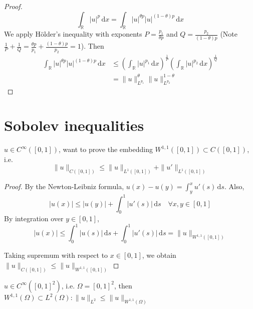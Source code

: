 \documentclass{report}
\begin{document}
\begin{proof}
    \[\int_{\mathbb{R}} \vert u \vert^p \,\mathrm{d}x = \int_{\mathbb{R}} \vert u \vert^{\theta p} \vert u \vert^{(1-\theta) p} \,\mathrm{d}x\]
    We apply Hölder's inequality with exponents \(P = \frac{p_1}{\theta p} \) and \(Q = \frac{p_2}{(1-\theta)p}\) (Note \(\frac{1}{P} + \frac{1}{Q} = \frac{\theta p}{p_1} + \frac{(1-\theta)p}{p_2} = 1\)). Then
    \begin{align*}
        \int_{\mathbb{R}} \vert u \vert^{\theta p} \vert u \vert^{(1-\theta) p} \,\mathrm{d}x &\leq \left(\int_{\mathbb{R}} \vert u \vert^{p_1} \,\mathrm{d}x \right)^{\frac{1}{P}} \left(\int_{\mathbb{R}} \vert u \vert^{p_2} \,\mathrm{d}x \right)^{\frac{1}{Q}} \\
        &= \|u\|_{L^{p_1}}^{\theta} \|u\|_{L^{p_2}}^{1 - \theta}
    \end{align*}
\end{proof}

\section{Sobolev inequalities}
{
    \(u \in C^{\infty}([0,1])\), want to prove the embedding \(W^{1, 1}([0,1]) \subset C([0,1])\), i.e.
    \begin{equation}\label{eq:3}
        \|u\|_{C([0,1])} \leq \|u\|_{L^{1}([0,1])} + \|u'\|_{L^{1}([0,1])}
    \end{equation}
}

\begin{proof}
    By the Newton-Leibniz formula, \(u(x) - u(y) = \int_{y}^{x} u'(s) \,\mathrm{d}s\). Also,
    \[|u(x)| \leq |u(y)| + \int_{0}^{1} |u'(s)| \,\mathrm{d}s \quad \forall x, y \in [0,1]\]
    By integration over \(y \in [0,1]\), 
    \[|u(x)| \leq \int_{0}^{1} |u(s)| \,\mathrm{d}s + \int_{0}^{1} |u'(s)| \,\mathrm{d}s = \|u\|_{W^{1, 1}([0, 1])}\]

    Taking supremum with respect to \(x \in [0,1]\), we obtain \(\|u\|_{C([0,1])} \leq \|u\|_{W^{1, 1}([0, 1])}\)
\end{proof}

{
    \(u \in C^{\infty}([0,1]^2)\), i.e. \(\Omega = [0,1]^2\), then \(W^{1, 1}(\Omega) \subset L^{2}(\Omega) : \|u\|_{L^{2}} \leq \|u\|_{W^{1, 1}(\Omega)}\)
}
\end{document}
